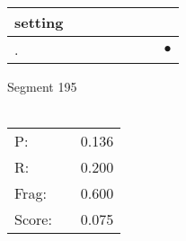\documentclass[landscape]{article}
\newcommand{\ssp}{\hspace{2pt}}
\newcommand{\mex}{\cellcolor{g}$\bullet$}
\begin{document}
\begin{tabular}{|l|p{10pt}|p{10pt}|p{10pt}|p{10pt}|p{10pt}|p{10pt}|p{10pt}|}
\hline
\ssp setting \ssp&\hspace{2pt}&\hspace{2pt}&\hspace{2pt}&\hspace{2pt}&\hspace{2pt}&\hspace{2pt}&\hspace{2pt}\\
\hline
\ssp \cellcolor{ref6}. \ssp&\hspace{2pt}&\hspace{2pt}&\hspace{2pt}&\hspace{2pt}&\hspace{2pt}&\hspace{2pt}&\hspace{2pt}\mex\\
\hline
\end{tabular}

\vspace{6pt}
\noindent Segment 195\\\\
\noindent\begin{tabular}{lm{12pt}r}
\hline
P:&&0.136\\
R:&&0.200\\
Frag:&&0.600\\
Score:&&0.075\\
\end{tabular}

\newpage
\end{document}
